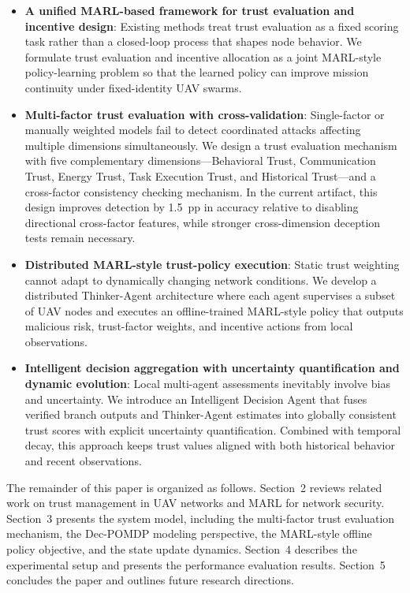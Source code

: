 \documentclass[notspecified,article,submit,moreauthors]{Definitions/mdpi}
\begin{document}
\begin{itemize}
    \item \textbf{A unified MARL-based framework for trust evaluation and incentive design}: Existing methods treat trust evaluation as a fixed scoring task rather than a closed-loop process that shapes node behavior. We formulate trust evaluation and incentive allocation as a joint MARL-style policy-learning problem so that the learned policy can improve mission continuity under fixed-identity UAV swarms.
    \item \textbf{Multi-factor trust evaluation with cross-validation}: Single-factor or manually weighted models fail to detect coordinated attacks affecting multiple dimensions simultaneously. We design a trust evaluation mechanism with five complementary dimensions---Behavioral Trust, Communication Trust, Energy Trust, Task Execution Trust, and Historical Trust---and a cross-factor consistency checking mechanism. In the current artifact, this design improves detection by 1.5~pp in accuracy relative to disabling directional cross-factor features, while stronger cross-dimension deception tests remain necessary.
    \item \textbf{Distributed MARL-style trust-policy execution}: Static trust weighting cannot adapt to dynamically changing network conditions. We develop a distributed Thinker-Agent architecture where each agent supervises a subset of UAV nodes and executes an offline-trained MARL-style policy that outputs malicious risk, trust-factor weights, and incentive actions from local observations.
    \item \textbf{Intelligent decision aggregation with uncertainty quantification and dynamic evolution}: Local multi-agent assessments inevitably involve bias and uncertainty. We introduce an Intelligent Decision Agent that fuses verified branch outputs and Thinker-Agent estimates into globally consistent trust scores with explicit uncertainty quantification. Combined with temporal decay, this approach keeps trust values aligned with both historical behavior and recent observations.
\end{itemize}

The remainder of this paper is organized as follows. Section~2 reviews related work on trust management in UAV networks and MARL for network security. Section~3 presents the system model, including the multi-factor trust evaluation mechanism, the Dec-POMDP modeling perspective, the MARL-style offline policy objective, and the state update dynamics. Section~4 describes the experimental setup and presents the performance evaluation results. Section~5 concludes the paper and outlines future research directions.
\end{document}
